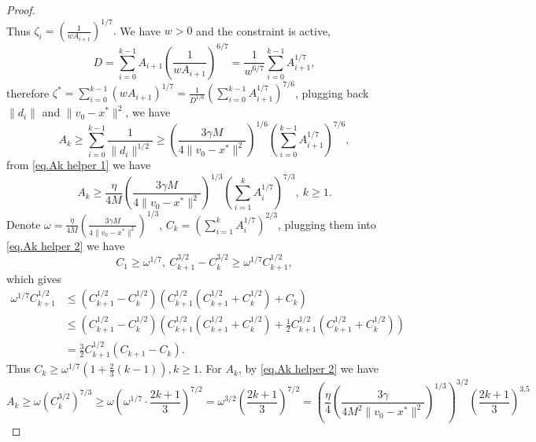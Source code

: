 \documentclass{article}
\begin{document}
\begin{proof}
\begin{equation*}
    \end{equation*}
    Thus \(
    \zeta_i
    =
    \left(
    \frac{1}{wA_{i+1}}
    \right)^{1/7}. \) We have $w>0$ and the constraint is active,
    \begin{equation*}
        D=\sum_{i=0}^{k-1} A_{i+1}\left(\frac{1}{w A_{i+1}}\right)^{6 / 7}=\frac{1}{w^{6 / 7}} \sum_{i=0}^{k-1} A_{i+1}^{1 / 7},
    \end{equation*}
    therefore $\zeta^*=\sum_{i=0}^{k-1}\left(w A_{i+1}\right)^{1 / 7}=\frac{1}{D^{1 / 6}}\left(\sum_{i=0}^{k-1} A_{i+1}^{1 / 7}\right)^{7 / 6}$, plugging back $\|d_i\| $ and $ \|v_0-x^*\|^2$, we have
    \begin{equation*}
        A_k\geq\sum_{i=0}^{k-1}\frac{1}{\|d_i\|^{1/2}} \geq \left (\frac{3\gamma M}{4\|v_0-x^*\|^2}\right)^{1/6} \left(\sum_{i=0}^{k-1} A_{i+1}^{1 / 7}\right)^{7 / 6},
    \end{equation*}
    from \eqref{eq.Ak helper 1} we have
    \begin{equation}
        \label{eq.Ak helper 2}
        A_k \geq \frac{\eta}{4M}\left (\frac{3\gamma M}{4\|v_0-x^*\|^2}\right)^{1/3} \left(\sum_{i=1}^{k} A_{i}^{1 / 7}\right)^{7 / 3}, \ k\geq 1.
    \end{equation}
    Denote $\omega = \frac{\eta}{4M}\left (\frac{3\gamma M}{4\|v_0-x^*\|^2}\right)^{1/3}$, $C_k =\left(\sum_{i=1}^k A_i^{1 / 7}\right)^{2 / 3}$, plugging them into \eqref{eq.Ak helper 2} we have
    \begin{equation*}
        C_1\geq\omega^{1/7},\ C_{k+1}^{3 / 2}-C_k^{3 / 2} \geq \omega^{1 / 7} C_{k+1}^{1 / 2},
    \end{equation*}
    which gives
    \begin{equation*}
        \begin{aligned}
            \omega^{1 / 7} C_{k+1}^{1 / 2} & \leq\left(C_{k+1}^{1 / 2}-C_k^{1 / 2}\right)\left(C_{k+1}^{1 / 2}\left(C_{k+1}^{1 / 2}+C_k^{1 / 2}\right)+C_k\right)                                                                 \\
                                           & \leq\left(C_{k+1}^{1 / 2}-C_k^{1 / 2}\right)\left(C_{k+1}^{1 / 2}\left(C_{k+1}^{1 / 2}+C_k^{1 / 2}\right)+\frac{1}{2} C_{k+1}^{1 / 2}\left(C_{k+1}^{1 / 2}+C_k^{1 / 2}\right)\right) \\
                                           & =\frac{3}{2} C_{k+1}^{1 / 2}\left(C_{k+1}-C_k\right).
        \end{aligned}
    \end{equation*}
    Thus $C_k \geq \omega^{1 / 7}\left(1+\frac{2}{3}(k-1)\right), k \geq 1$. For $A_k$, by \eqref{eq.Ak helper 2} we have
    \begin{equation*}
        A_k  \geq \omega\left(C_k^{3 / 2}\right)^{7 / 3} \geq \omega\left(\omega^{1 / 7} \cdot \frac{2 k+1}{3}\right)^{7 / 2}=\omega^{3 / 2}\left(\frac{2 k+1}{3}\right)^{7 / 2}
        =\left(\frac{\eta}{4}\left (\frac{3\gamma}{4M^2\|v_0-x^*\|^2}\right)^{1/3}\right)^{3 / 2}\left(\frac{2 k+1}{3}\right)^{3.5}
    \end{equation*}
\end{proof}
\end{document}
